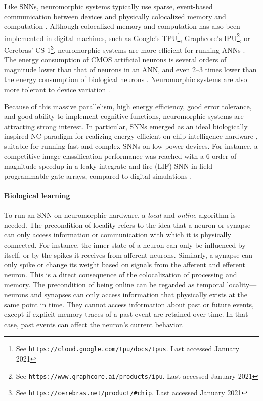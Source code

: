 Like SNNs, neuromorphic systems typically use sparse, event-based communication between devices
and physically colocalized memory and computation \citep{sterling2015principles,neftci2018data}.
Although colocalized memory and computation has also been implemented in digital machines, such as Google's TPU\footnote{See \texttt{https://cloud.google.com/tpu/docs/tpus}. Last accessed January 2021}, Graphcore's IPU\footnote{See \texttt{https://www.graphcore.ai/products/ipu}. Last accessed January 2021}, or Cerebras' CS-1\footnote{See \texttt{https://cerebras.net/product/\#chip}. Last accessed January 2021}, neuromorphic systems are more efficient for running ANNs \citep{merolla2014million,rajendran2019low}.
The energy consumption of CMOS artificial neurons is several orders of magnitude lower than that of neurons in an ANN, and even 2--3 times lower than the energy consumption of biological neurons \citep{elbez2020progressive}.
Neuromorphic systems are also more tolerant to device variation \citep{yu2013low}.

Because of this massive parallelism, high energy efficiency, good error tolerance, and good ability to implement cognitive functions, neuromorphic systems are attracting strong interest.
In particular, SNNs emerged as an ideal biologically inspired NC paradigm for realizing energy-efficient on-chip intelligence hardware \citep{merolla2014million,davies2018loihi}, suitable for running fast and complex SNNs on low-power devices.
For instance, a competitive image classification performance was reached with a 6-order of magnitude speedup in a leaky integrate-and-fire (LIF) SNN in field-programmable gate arrays, compared to digital simulations \citep{zhang2020low}.

\paragraph{Biological learning}
To run an SNN on neuromorphic hardware, a \emph{local} and \emph{online} algorithm is needed.
The precondition of locality refers to the idea that a neuron or synapse can only access information or communication with which it is physically connected.
For instance, the inner state of a neuron can only be influenced by itself, or by the spikes it receives from afferent neurons.
Similarly, a synapse can only spike or change its weight based on signals from the afferent and efferent neuron.
This is a direct consequence of the colocalization of processing and memory.
The precondition of being online can be regarded as temporal locality---neurons and synapses can only access information that physically exists at the same point in time.
They cannot access information about past or future events, except if explicit memory traces of a past event are retained over time.
In that case, past events can affect the neuron's current behavior.

